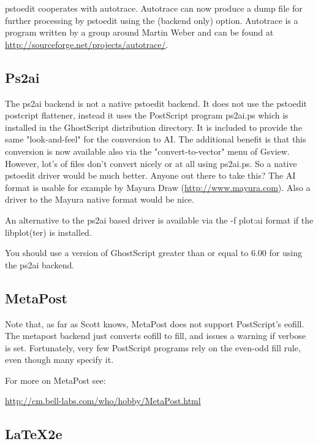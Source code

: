 \documentclass[english,a4paper]{article}
\let\URL\url \let\Email\url \let\File\url
\begin{document}
	pstoedit cooperates with autotrace. Autotrace can now produce a dump file 
	for further processing by pstoedit using the  (backend only) option. 
	Autotrace is a program written by a group around Martin Weber and can be 
	found at \URL{http://sourceforge.net/projects/autotrace/}.

  \subsection{Ps2ai}

    The ps2ai backend is not a native pstoedit backend. It does not use the
    pstoedit postcript flattener, instead it uses the PostScript program
    ps2ai.ps which is installed in the GhostScript distribution directory. It
    is included  to provide the same "look-and-feel" for the conversion to AI.
    The additional benefit is that this conversion is now available also via
    the "convert-to-vector" menu of Gsview. However, lot's of files don't
    convert nicely or at all using ps2ai.ps. So a native pstoedit driver would
    be much better. Anyone out there to take this? The AI format is usable for
    example by Mayura Draw (\URL{http://www.mayura.com}). Also a driver to the
    Mayura native format would be nice. 

    An alternative to the ps2ai based driver is available via the -f plot:ai format if the libplot(ter) is installed.

    You should use a version of GhostScript greater than or equal to 6.00 for using the ps2ai backend.


  \subsection{MetaPost}

    Note that, as far as Scott knows, MetaPost does not support PostScript's
    eofill. The metapost backend just converts eofill to fill, and issues a warning if
    verbose is set. Fortunately, very few PostScript programs rely on the
    even-odd fill rule, even though many specify it.

    For more on MetaPost see: 
    
    \URL{http://cm.bell-labs.com/who/hobby/MetaPost.html}

  \subsection{LaTeX2e} 
\end{document}
